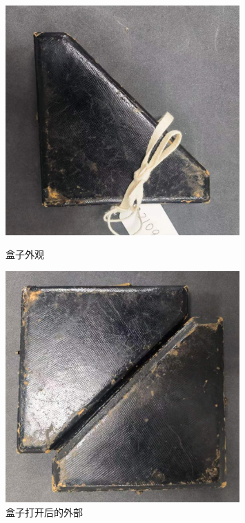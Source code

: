 \documentclass[UTF8]{ctexart}
\begin{document}
\begin{figure}[h]
    \centering
    \begin{minipage}[t]{0.33\textwidth}
        \centering
        \includegraphics[width=0.8\textwidth]{img/box_surface.jpg}
        \caption{盒子外观}
    \label{fig:box_surface}
    \end{minipage}
    \begin{minipage}[t]{0.32\textwidth}
        \centering
        \includegraphics[width=0.8\textwidth]{img/box_surface_outside.jpg}
        \caption{盒子打开后的外部}
    \label{fig:box_surface_outside}
    \end{minipage}

\end{figure}
\end{document}
